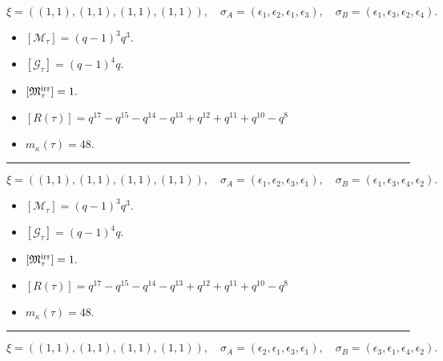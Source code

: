 \documentclass[10pt,a4paper]{amsart}
\begin{document}
$$\xi = ({(1, 1)}, {(1, 1)}, {(1, 1)}, {(1, 1)}),\quad \sigma_A = ({{\epsilon_1}}, {{\epsilon_2}}, {{\epsilon_1}}, {{\epsilon_3}}),\quad \sigma_B = ({{\epsilon_1}}, {{\epsilon_3}}, {{\epsilon_2}}, {{\epsilon_4}}).$$

\begin{itemize}
 \item $[\mathcal{M}_{\tau}] = {\left(q - 1\right)}^{3} q^{3} .$

 \item $[\mathcal{G}_{\tau}] = {\left(q - 1\right)}^{4} q .$

 \item $[{\frak M}_{\tau}^{\textrm{irr}}] = 1 .$

 \item $[R(\tau)] = q^{17} - q^{15} - q^{14} - q^{13} + q^{12} + q^{11} + q^{10} - q^{8} $

 \item $m_{\kappa}(\tau) = 48 .$

 \end{itemize}
\noindent\rule{8cm}{0.4pt}

$$\xi = ({(1, 1)}, {(1, 1)}, {(1, 1)}, {(1, 1)}),\quad \sigma_A = ({{\epsilon_1}}, {{\epsilon_2}}, {{\epsilon_3}}, {{\epsilon_1}}),\quad \sigma_B = ({{\epsilon_1}}, {{\epsilon_3}}, {{\epsilon_4}}, {{\epsilon_2}}).$$

\begin{itemize}
 \item $[\mathcal{M}_{\tau}] = {\left(q - 1\right)}^{3} q^{3} .$

 \item $[\mathcal{G}_{\tau}] = {\left(q - 1\right)}^{4} q .$

 \item $[{\frak M}_{\tau}^{\textrm{irr}}] = 1 .$

 \item $[R(\tau)] = q^{17} - q^{15} - q^{14} - q^{13} + q^{12} + q^{11} + q^{10} - q^{8} $

 \item $m_{\kappa}(\tau) = 48 .$

 \end{itemize}
\noindent\rule{8cm}{0.4pt}

$$\xi = ({(1, 1)}, {(1, 1)}, {(1, 1)}, {(1, 1)}),\quad \sigma_A = ({{\epsilon_2}}, {{\epsilon_1}}, {{\epsilon_3}}, {{\epsilon_1}}),\quad \sigma_B = ({{\epsilon_3}}, {{\epsilon_1}}, {{\epsilon_4}}, {{\epsilon_2}}).$$
\end{document}
